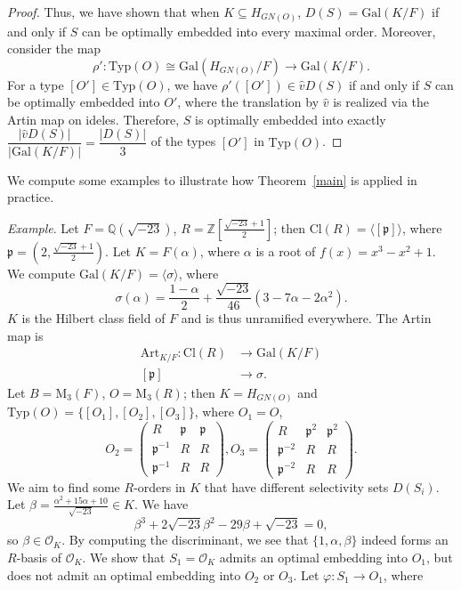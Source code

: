 \documentclass[12pt]{article}
\theoremstyle{plain}
\theoremstyle{definition}
\theoremstyle{remark}
\begin{document}
\begin{proof}
Thus, we have shown that when $K \subseteq H_{GN(O)}$, $D(S)=\mathrm{Gal}(K/F)$ if and only if $S$ can be optimally embedded into every maximal order. Moreover, consider the map
$$\rho':\mathrm{Typ}(O)\cong \mathrm{Gal}(H_{GN(O)}/F)\longrightarrow \mathrm{Gal}(K/F).$$
For a type $[O']\in \mathrm{Typ}(O)$, we have $\rho'([O'])\in \widehat{v}D(S)$ if and only if $S$ can be optimally embedded into $O'$, where the translation by $\widehat{v}$ is realized via the Artin map on ideles. Therefore, $S$ is optimally embedded into exactly $\dfrac{|\widehat{v}D(S)|}{|\mathrm{Gal}(K/F)|}=\dfrac{|D(S)|}{3}$ of the types $[O']$ in $\mathrm{Typ}(O)$.
\end{proof}

We compute some examples to illustrate how Theorem~\ref{main} is applied in practice.

\emph{Example}. Let $F=\mathbb{Q}(\sqrt{-23})$, $R=\mathbb{Z}[\frac{\sqrt{-23}+1}{2}]$; then $\mathrm{Cl}(R)=\langle [\mathfrak{p}] \rangle$, where $\mathfrak{p}=(2,\frac{\sqrt{-23}+1}{2})$. Let $K=F(\alpha)$, where $\alpha$ is a root of $f(x)=x^3-x^2+1$. We compute $\mathrm{Gal}(K/F)=\langle\sigma\rangle$, where
$$\sigma(\alpha)=\frac{1-\alpha}{2}+\frac{\sqrt{-23}}{46}(3-7\alpha-2\alpha^2).$$
$K$ is the Hilbert class field of $F$ and is thus unramified everywhere. The Artin map is
\begin{align*}
\mathrm{Art}_{K/F}:\mathrm{Cl}(R)&\longrightarrow \mathrm{Gal}(K/F)\\
[\mathfrak{p}]&\longrightarrow \sigma .
\end{align*}
Let $B=\mathrm{M}_3(F)$, $O=\mathrm{M}_3(R)$; then $K=H_{GN(O)}$ and $\mathrm{Typ} (O)=\{[O_1],[O_2],[O_3]\}$, where $O_1=O$,
$$O_2=\begin{pmatrix}
R & \mathfrak{p} & \mathfrak{p} \\
\mathfrak{p}^{-1} & R & R \\
\mathfrak{p}^{-1} & R & R
\end{pmatrix}, 
O_3=\begin{pmatrix}
R & \mathfrak{p}^2 & \mathfrak{p}^2 \\
\mathfrak{p}^{-2} & R & R \\
\mathfrak{p}^{-2} & R & R
\end{pmatrix}.$$
We aim to find some $R$-orders in $K$ that have different selectivity sets $D(S_i)$. Let $\beta=\frac{\alpha^2+15\alpha+10}{\sqrt{-23}}\in K$. We have
$$\beta^3+2\sqrt{-23}\beta^2-29\beta+\sqrt{-23}=0,$$
so $\beta\in \mathcal{O}_K$. By computing the discriminant, we see that $\{1, \alpha, \beta\}$ indeed forms an $R$-basis of $\mathcal{O}_K$. We show that $S_1=\mathcal{O}_K$ admits an optimal embedding into $O_1$, but does not admit an optimal embedding into $O_2$ or $O_3$. Let $\varphi:S_1\rightarrow O_1$, where
\end{document}
